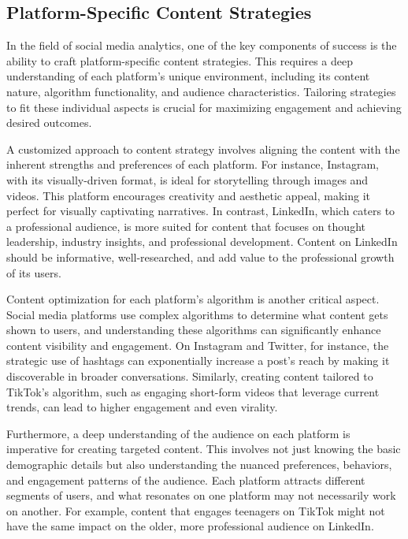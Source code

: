 \documentclass[
]{book}
\begin{document}
\hypertarget{platform-specific-content-strategies}{%
\subsection*{Platform-Specific Content Strategies}\label{platform-specific-content-strategies}}

In the field of social media analytics, one of the key components of success is the ability to craft platform-specific content strategies. This requires a deep understanding of each platform's unique environment, including its content nature, algorithm functionality, and audience characteristics. Tailoring strategies to fit these individual aspects is crucial for maximizing engagement and achieving desired outcomes.

A customized approach to content strategy involves aligning the content with the inherent strengths and preferences of each platform. For instance, Instagram, with its visually-driven format, is ideal for storytelling through images and videos. This platform encourages creativity and aesthetic appeal, making it perfect for visually captivating narratives. In contrast, LinkedIn, which caters to a professional audience, is more suited for content that focuses on thought leadership, industry insights, and professional development. Content on LinkedIn should be informative, well-researched, and add value to the professional growth of its users.

Content optimization for each platform's algorithm is another critical aspect. Social media platforms use complex algorithms to determine what content gets shown to users, and understanding these algorithms can significantly enhance content visibility and engagement. On Instagram and Twitter, for instance, the strategic use of hashtags can exponentially increase a post's reach by making it discoverable in broader conversations. Similarly, creating content tailored to TikTok's algorithm, such as engaging short-form videos that leverage current trends, can lead to higher engagement and even virality.

Furthermore, a deep understanding of the audience on each platform is imperative for creating targeted content. This involves not just knowing the basic demographic details but also understanding the nuanced preferences, behaviors, and engagement patterns of the audience. Each platform attracts different segments of users, and what resonates on one platform may not necessarily work on another. For example, content that engages teenagers on TikTok might not have the same impact on the older, more professional audience on LinkedIn.
\end{document}
